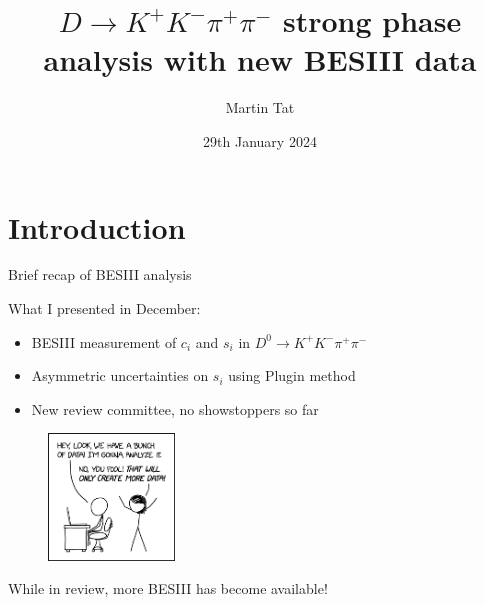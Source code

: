 \documentclass{beamer}
\title[$K^+K^-\pi^+\pi^-$]{\texorpdfstring{$D\to K^+K^-\pi^+\pi^-$}{K+K-pi+pi-} strong phase analysis with new BESIII data}
\author{Martin Tat}
\institute{Oxford LHCb}
\date{29th January 2024}
\begin{document}
\begin{frame}
  \titlepage
\end{frame}


\section{Introduction}

\begin{frame}{Brief recap of BESIII analysis}
  \begin{center}
    \Large{What I presented in December:}
  \end{center}
  \vspace{0.1cm}
  \begin{itemize}
    \setlength\itemsep{0.7em}
    \item{BESIII measurement of $c_i$ and $s_i$ in $D^0\to K^+K^-\pi^+\pi^-$}
    \item{Asymmetric uncertainties on $s_i$ using Plugin method}
    \item{New review committee, no showstoppers so far}
  \end{itemize}
  \begin{figure}
    \centering
    \includegraphics[width = 0.3\textwidth]{Plots/XKCD_Data_Trap.png}
  \end{figure}
  \begin{center}
    \Large{While in review, more BESIII has become available!}
  \end{center}
\end{frame}
\end{document}
